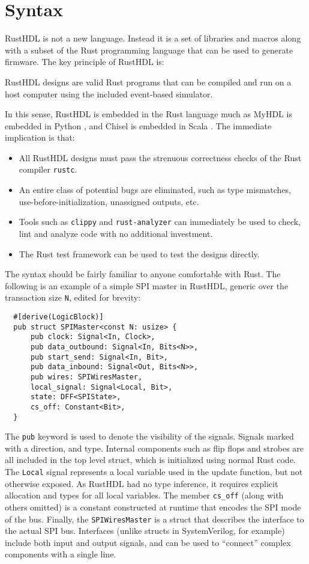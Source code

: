 \documentclass[sigplan,screen,sigconf]{acmart}
\begin{document}
\section{Syntax}
RustHDL is not a new language.  Instead it is a set of libraries and macros along with a 
subset of the Rust programming language that can be used to generate firmware.  The key
principle of RustHDL is:

\begin{tcolorbox}
RustHDL designs are valid Rust programs that can be compiled and run on a host computer
using the included event-based simulator.
\end{tcolorbox}

In this sense, RustHDL is embedded in the Rust language much as MyHDL is embedded in Python \cite{b3},
and Chisel is embedded in Scala \cite{b2}.  The immediate implication is that:
\begin{itemize}
  \item All RustHDL designs must pass the strenuous correctness checks of the Rust compiler \verb|rustc|.
  \item An entire class of potential bugs are eliminated, such as type mismatches, use-before-initialization,
  unassigned outputs, etc.
  \item Tools such as \verb|clippy| and \verb|rust-analyzer| can immediately be used to
  check, lint and analyze code with no additional investment.
  \item The Rust test framework can be used to test the designs directly.
\end{itemize}

The syntax should be fairly familiar to anyone comfortable with Rust.  The following is an example
of a simple SPI master in RustHDL, generic over the transaction size \verb|N|, edited for brevity:

\begin{verbatim}
  #[derive(LogicBlock)]
  pub struct SPIMaster<const N: usize> {
      pub clock: Signal<In, Clock>,
      pub data_outbound: Signal<In, Bits<N>>,
      pub start_send: Signal<In, Bit>,
      pub data_inbound: Signal<Out, Bits<N>>,
      pub wires: SPIWiresMaster,
      local_signal: Signal<Local, Bit>,
      state: DFF<SPIState>,
      cs_off: Constant<Bit>,
  }
\end{verbatim}  

The \verb|pub| keyword is used to denote the visibility of the signals.  Signals 
marked with a direction, and type.  Internal components such as flip flops and strobes
are all included in the top level struct, which is initialized using normal Rust code.
The \verb|Local| signal represents a local variable used in the update function, but
not otherwise exposed.  As RustHDL had no type inference, it requires explicit allocation
and types for all local variables.  The member \verb|cs_off| (along with others omitted) is a  
constant constructed at runtime that encodes the SPI mode of the bus.  Finally, 
the \verb|SPIWiresMaster| is a struct that describes the interface to the actual SPI bus.
Interfaces (unlike structs in SystemVerilog, for example) include both input and output
signals, and can be used to ``connect'' complex components with a single line.  
\end{document}
